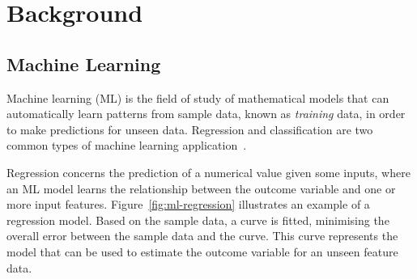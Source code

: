 \chapter{Background} \label{chp:background}








\section{Machine Learning}

Machine learning (ML) is the field of study of mathematical models that can automatically learn patterns from sample data, known as \textit{training} data, in order to make predictions for unseen data.
Regression and classification are two common types of machine learning application~\cite{goodfellow16}.

Regression concerns the prediction of a numerical value given some inputs, where an ML model learns the relationship between the outcome variable and one or more input features.
Figure~\ref{fig:ml-regression} illustrates an example of a regression model.
Based on the sample data, a curve is fitted, minimising the overall error between the sample data and the curve.
This curve represents the model that can be used to estimate the outcome variable for an unseen feature data.

